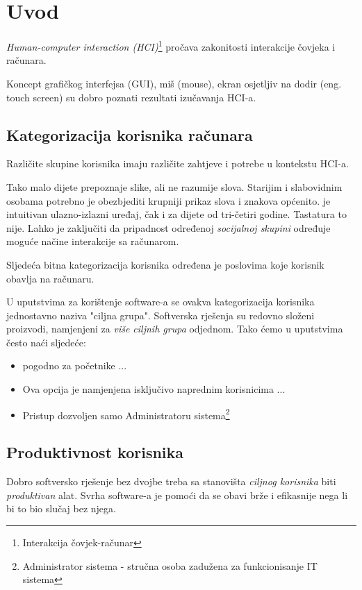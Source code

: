 \documentclass[times, utf8, seminar]{fit}
\begin{document}

\chapter{Uvod}

\emph{Human-computer interaction (HCI)}\footnote{Interakcija čovjek-računar} pročava zakonitosti interakcije čovjeka i računara.

Koncept grafičkog interfejsa (GUI), miš (mouse), ekran osjetljiv na dodir (eng. touch screen) su dobro poznati rezultati izučavanja HCI-a.

\section{Kategorizacija korisnika računara}

Različite skupine korisnika imaju različite zahtjeve i potrebe u kontekstu HCI-a. 

Tako malo dijete prepoznaje slike, ali ne razumije slova. Starijim i slabovidnim osobama potrebno je obezbjediti krupniji prikaz slova i znakova općenito.  je intuitivan ulazno-izlazni uređaj, čak i za dijete od tri-četiri godine. Tastatura to nije. Lahko je zaključiti da pripadnost određenoj \emph{socijalnoj skupini} određuje moguće načine interakcije sa računarom.

Sljedeća bitna kategorizacija korisnika određena je poslovima koje korisnik obavlja na računaru. 

U uputstvima za korištenje software-a se ovakva kategorizacija korisnika jednostavno naziva "ciljna grupa". Softverska rješenja su redovno složeni proizvodi, namjenjeni za \emph{više ciljnih grupa} odjednom. Tako ćemo u uputstvima često naći sljedeće:
\begin{itemize}
  \item pogodno za početnike ...
  \item Ova opcija je namjenjena isključivo naprednim korisnicima ...
  \item Pristup dozvoljen samo Administratoru sistema\footnote{Administrator sistema - stručna osoba zadužena za funkcionisanje IT sistema}
\end{itemize}

\section{Produktivnost korisnika}

Dobro softversko rješenje bez dvojbe treba sa stanovišta \emph{ciljnog korisnika} biti \emph{produktivan} alat. Svrha software-a je pomoći da se obavi brže i efikasnije nega li bi to bio slučaj bez njega.
\end{document}

